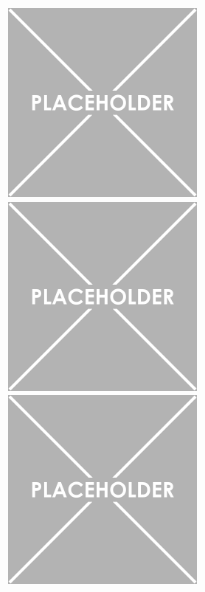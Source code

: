 \documentclass[a4paper, 11pt]{report}
\begin{document}
\begin{figure}[htbp]
\begin{minipage}[b]{.32\textwidth}
\includegraphics[width=6cm, height=5cm]{figs/placeholder.png}
\end{minipage}\hfill
\begin{minipage}[b]{.32\textwidth}
\includegraphics[width=6cm, height=5cm]{figs/placeholder.png}
\end{minipage} \hfill
\begin{minipage}[b]{.32\textwidth}
\includegraphics[width=6cm, height=5cm]{figs/placeholder.png}
\end{minipage} \hfill \vspace{10pt}


\end{figure}
\end{document}

